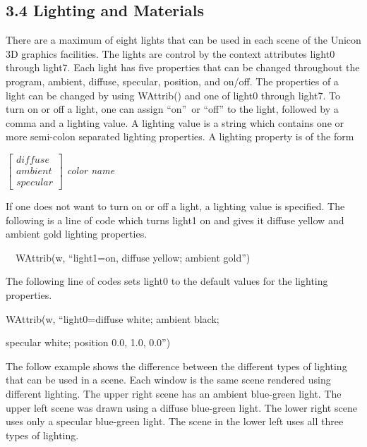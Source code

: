 \documentclass[letterpaper]{article}
\begin{document}
\subsection[3.4 Lighting and Materials]{3.4 Lighting and Materials}


{
There are a maximum of eight lights that can be used in each scene of the Unicon 3D graphics facilities. The lights are
control by the context attributes \textsf{light0} through \textsf{light7}. Each light has five properties that can be
changed throughout the program, ambient, diffuse, specular, position, and on/off. The properties of a light can be
changed by using \textsf{WAttrib()} and one of \textsf{light0} through \textsf{light7}. To turn on or off a light,
one can assign \textsf{{}``on''}\texttt{ }or \textsf{{}``off''} to the light, followed by a comma and a lighting value.
A lighting value is a string which contains one or more semi-colon separated lighting properties. A lighting property
is of the form

\bigskip

$\left[
\begin{array}{l}
diffuse\\ambient\\specular
\end{array}
\right]$ \textsf{\textit{color name}}

\bigskip

If one does not want to turn on or off a light, a lighting value is
specified. The following is a line of code which turns \textsf{light1}
on and gives it diffuse yellow and ambient gold lighting properties.

\bigskip

{
\ \ \textsf{WAttrib(w, ``light1=on, diffuse yellow; ambient gold'')}}

\bigskip

{
The following line of codes sets \textsf{light0} to the default values for the lighting properties. }


\bigskip

{\sffamily
WAttrib(w, ``light0=diffuse white; ambient black; }

{\sffamily
specular white; position 0.0, 1.0, 0.0'')}


\bigskip

{
The follow example shows the difference between the different types of lighting that can be used in a scene. Each window
is the same scene rendered using different lighting. The upper right scene has an ambient blue-green light. The upper
left scene was drawn using a diffuse blue-green light. The lower right scene uses only a specular blue-green light. The
scene in the lower left uses all three types of lighting.}


}
\end{document}
